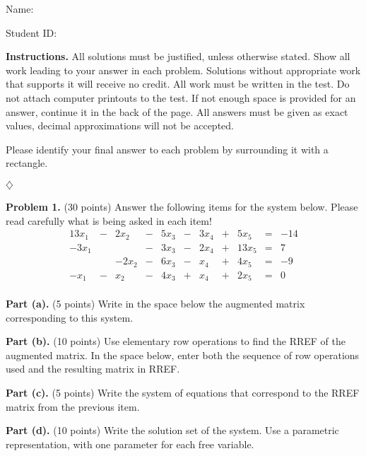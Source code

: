 \documentclass[12pt]{article}
\begin{document}
Name: \hrulefill

\bigskip
Student ID: \hrulefill

\bigskip
\textbf{Instructions.} All solutions must be justified, unless otherwise stated. Show all work leading to your answer in each problem. Solutions without appropriate work that supports it will receive no credit. All work must be written in the test. Do not attach computer printouts to the test. If not enough space is provided for an answer, continue it in the back of the page. All answers must be given as exact values, decimal approximations will not be accepted.

Please identify your final answer to each problem by surrounding it with a rectangle.

\vfill
\hfill$\diamondsuit$

\clearpage

\textbf{Problem 1.} (30 points)
Answer the following items for the system below. Please read carefully what is being asked in each item!
\begin{alignat*}{13}
x_{1} &{}-{}& 2 x_{2} &{}-{}& 5 x_{3} &{}-{}& 3 x_{4} &{}+{}& 5 x_{5} &{}={}&-14\\ 
- 3 x_{1}&{}{}& &{}-{}& 3 x_{3} &{}-{}& 2 x_{4} &{}+{}& 13 x_{5} &{}={}&7\\ 
&{}{}&- 2 x_{2} &{}-{}& 6 x_{3} &{}-{}& x_{4} &{}+{}& 4 x_{5} &{}={}&-9\\ 
- x_{1} &{}-{}& x_{2} &{}-{}& 4 x_{3} &{}+{}& x_{4} &{}+{}& 2 x_{5} &{}={}&0\\ 
\end{alignat*}

\textbf{Part (a).} (5 points) Write in the space below the augmented matrix corresponding to this system.

\vskip1.5in

\textbf{Part (b).} (10 points) Use elementary row operations to find the RREF of the augmented matrix. In the space below, enter both the sequence of row operations used and the resulting matrix in RREF.

\clearpage

\textbf{Part (c).} (5 points) Write the system of equations that correspond to the RREF matrix from the previous item.

\vskip3in

\textbf{Part (d).} (10 points) Write the solution set of the system. Use a parametric representation, with one parameter for each free variable.

\clearpage
\end{document}
